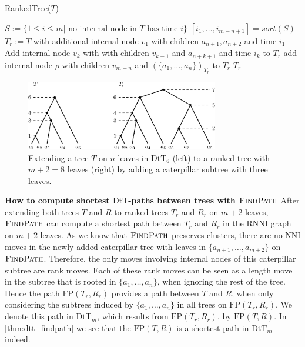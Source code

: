 \documentclass[11pt]{amsart}
\newcommand{\rnni}{\mathrm{RNNI}}
\newcommand{\findpath}{\textsc{FindPath}}
\newcommand{\nni}{\mathrm{NNI}}
\newcommand{\fp}{\mathrm{FP}}
\newcommand{\dtt}{\mathrm{DtT}}
\newcommand{\summary}[1]{\textbf{#1}} %
\begin{document}
\begin{algorithm}[ht]
	\caption{RankedTree($T$)}
	\label{alg:ranked_tree}
	\begin{algorithmic}[1]
		\STATE $S:= \{1 \leq i \leq m | \text{ no internal node in } T \text{ has time } i\}$
		\STATE $[i_1, \ldots, i_{m-n+1}] = sort(S)$
		\STATE $T_r := T$ with additional internal node $v_1$ with children $a_{n+1}, a_{n+2}$ and time $i_1$
			\STATE Add internal node $v_k$ with with children $v_{k-1}$ and $a_{n+k+1}$ and time $i_k$ to $T_r$
		\STATE add internal node $\rho$ with children $v_{m-n}$ and $(\{a_1, \ldots, a_n\})_{T_r}$ to $T_r$
		\ENDFOR
		\RETURN $T_r$
	\end{algorithmic}
\end{algorithm}

\begin{figure}[ht]
	\includegraphics[width=0.75\textwidth]{dtt_to_ranked_tree.eps}
	\caption{Extending a tree $T$ on $n$ leaves in $\dtt_6$ (left) to a ranked tree with $m+2=8$ leaves (right) by adding a caterpillar subtree with three leaves.}
	\label{fig:dtt_to_ranked_tree}
\end{figure}

\summary{How to compute shortest $\dtt$-paths between trees with $\findpath$}
After extending both trees $T$ and $R$ to ranked trees $T_r$ and $R_r$ on $m+2$ leaves, $\findpath$ can compute a shortest path between $T_r$ and $R_r$ in the $\rnni$ graph on $m+2$ leaves.
As we know that $\findpath$ preserves clusters, there are no $\nni$ moves in the newly added caterpillar tree with leaves in $\{a_{n+1}, \ldots, a_{m+2}\}$ on $\findpath$.
Therefore, the only moves involving internal nodes of this caterpillar subtree are rank moves.
Each of these rank moves can be seen as a length move in the subtree that is rooted in $\{a_1, \ldots, a_n\}$, when ignoring the rest of the tree.
Hence the path $\fp(T_r,R_r)$ provides a path between $T$ and $R$, when only considering the subtrees induced by $\{a_1, \ldots, a_n\}$ in all trees on $\fp(T_r, R_r)$.
We denote this path in $\dtt_m$, which results from $\fp(T_r, R_r)$, by $\fp(T,R)$.
In \autoref{thm:dtt_findpath} we see that the $\fp(T,R)$ is a shortest path in $\dtt_m$ indeed.
\end{document}
